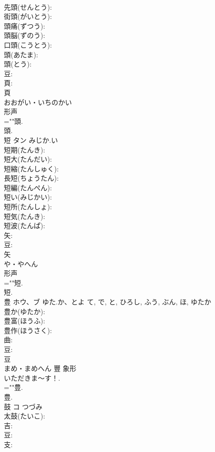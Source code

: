 \documentclass[8pt]{extreport}
\begin{document}
\begin{CJK}{UTF8}{min}
\\	先頭(せんとう): 
\\	街頭(がいとう): 
\\	頭痛(ずつう): 
\\	頭脳(ずのう): 
\\	口頭(こうとう): 
\\	頭(あたま): 
\\	頭(とう): 
\\	豆: 
\\	頁: 
\\	頁	
\\	おおがい・いちのかい	
\\	形声 
\\	=""頭.
\\	頭.
\\	短	タン	みじか.い		
\\	短期(たんき): 
\\	短大(たんだい): 
\\	短縮(たんしゅく): 
\\	長短(ちょうたん): 
\\	短編(たんぺん): 
\\	短い(みじかい): 
\\	短所(たんしょ): 
\\	短気(たんき): 
\\	短波(たんぱ): 
\\	矢: 
\\	豆: 
\\	矢	
\\	や・やへん	
\\	形声 
\\	=""短.
\\	短.
\\	豊	ホウ、ブ	ゆた.か、とよ	て, で, と, ひろし, ふう, ぶん, ほ, ゆたか	
\\	豊か(ゆたか): 
\\	豊富(ほうふ): 
\\	豊作(ほうさく): 
\\	曲: 
\\	豆: 
\\	豆	
\\	まめ・まめへん	豐	象形 
\\	いただきま〜す！.	
\\	=""豊.
\\	豊.
\\	鼓	コ	つづみ		
\\	太鼓(たいこ): 
\\	吉: 
\\	豆: 
\\	支: 

\end{CJK}
\end{document}
